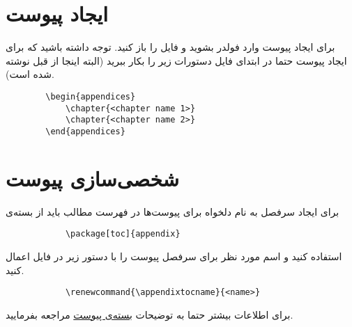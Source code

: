 \clearpage 
\lhead{ }
\appendix
	
\chapter{ ایجاد پیوست} \label{create appendix}
	
	برای ایجاد پیوست وارد فولدر 
	بشوید و فایل 
	را باز کنید. توجه داشته باشید که برای ایجاد پیوست حتما در ابتدای فایل دستورات زیر را بکار ببرید (البته اینجا از قبل نوشته شده است). 
	
\begin{latin}
	\begin{verbatim}
		\begin{appendices}
			\chapter{<chapter name 1>}
			\chapter{<chapter name 2>}
		\end{appendices}
	\end{verbatim}
\end{latin} 
	
\chapter{شخصی‌سازی پیوست} \label{option appendix}
	
	برای ایجاد سر‌فصل به نام دلخواه برای پیوست‌ها در فهرست مطالب باید از بسته‌ی 
	\begin{latin}
		\begin{verbatim}
			\package[toc]{appendix}
		\end{verbatim}
	\end{latin} 
	استفاده کنید و اسم مورد نظر برای سرفصل پیوست‌ را با دستور زیر در فایل
	اعمال کنید. 
	
	\begin{latin}
		\begin{verbatim}
			\renewcommand{\appendixtocname}{<name>}
		\end{verbatim}
	\end{latin} 
	
	برای اطلاعات بیشتر حتما به توضیحات 
	\href{https://ctan.org/pkg/appendix?lang=en}
	{بسته‌ی پیوست} 
	مراجعه بفرمایید. 

